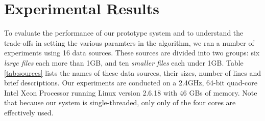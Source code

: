 \section{Experimental Results}
\label{sec:eval}

To evaluate the performance of our prototype system and to understand the
trade-offs in setting the various paramters in the algorithm, we ran a number
of experiments using 16 data sources. These sources are divided into two groups:
six {\em large files} each more than 1GB, 
and ten {\em smaller files} each under 1GB. 
Table \ref{tab:sources} lists the names of these data sources, their sizes,
number of lines and brief descriptions. Our experiments are
conducted on a 2.4GHz, 64-bit quad-core Intel Xeon Processor 
running Linux version 2.6.18 with 46 GBs of memory. Note that because our
system is single-threaded, only only of the four cores are effectively
used.


